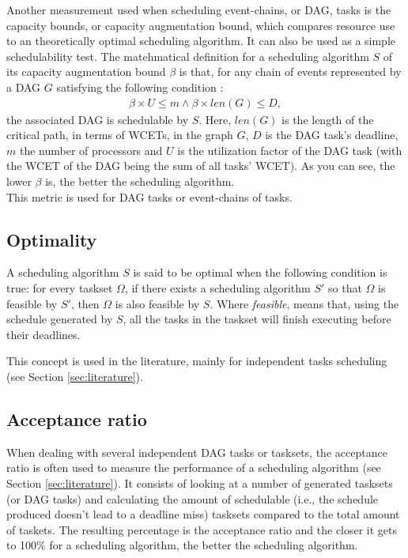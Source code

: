 Another measurement used when scheduling event-chains, or DAG, tasks  
is the capacity bounds, or capacity augmentation bound,
which compares resource use to an theoretically optimal scheduling algorithm.
It can also be used as a simple schedulability test.
The matehmatical definition for a scheduling algorithm $S$ of its capacity
augmentation bound $\beta$ is that, for any chain of events represented by a DAG $G$
satisfying the following condition :
\begin{align}
    \beta \times U \leq m \wedge  \beta \times len(G) \leq D,
\end{align}
the associated DAG is schedulable by $S$.
Here, $len(G)$ is the length of the critical path, in terms of WCETs,
in the graph $G$, $D$ is the DAG task's deadline, $m$ the number of processors and $U$
is the utilization factor of the DAG task (with the WCET of the DAG being the sum of all tasks' WCET).
As you can see, the lower $\beta$ is, the better the scheduling algorithm.\\
This metric is used for DAG tasks or event-chains of tasks.

\subsection{Optimality}

A scheduling algorithm $S$ is said to be optimal 
when the following condition is true:
for every taskset $\Omega$, if there exists 
a scheduling algorithm $S'$ so that $\Omega$ is feasible by $S'$,
then $\Omega$ is also feasible by $S$.
Where {\it{feasible}}, 
means that, using the schedule generated by $S$,
all the tasks in the taskset will finish executing before their deadlines.

This concept is used in the literature, mainly for independent tasks scheduling
(see Section \ref{sec:literature}).

\subsection{Acceptance ratio}

When dealing with several independent DAG tasks
or tasksets, 
the acceptance ratio is often used to measure the 
performance of a scheduling algorithm (see Section \ref{sec:literature}).
It consists of looking at a number of generated tasksets (or DAG tasks)
and calculating the amount of schedulable (i.e., 
the schedule produced doesn't lead to a deadline miss) tasksets compared to 
the total amount of taskets.
The resulting percentage is the acceptance ratio 
and the closer it gets to 100\% for a scheduling algorithm, the better the scheduling algorithm.


